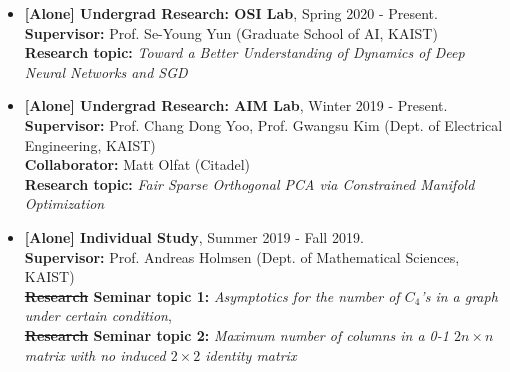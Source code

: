 \documentclass[10pt,a4]{article}
\begin{document}
\begin{small}
\begin{itemize}
 \item 
 	{\bf [Alone] Undergrad Research: OSI Lab}, Spring 2020 - Present. \\
 {\bf Supervisor:} Prof. Se-Young Yun (Graduate School of AI, KAIST) \\
 {\bf Research topic:} {\it Toward a Better Understanding of Dynamics of Deep Neural Networks and SGD } \\


 \item {\bf [Alone] Undergrad Research:
  AIM Lab}, Winter 2019 - Present. \\
 {\bf Supervisor:} Prof. Chang Dong Yoo, Prof. Gwangsu Kim (Dept. of Electrical Engineering, KAIST) \\
 {\bf Collaborator:} Matt Olfat (Citadel) \\
 {\bf Research topic:} {\it Fair Sparse Orthogonal PCA via Constrained Manifold Optimization} \\

 \item {\bf [Alone] Individual Study}, Summer 2019 - Fall 2019. \\
 {\bf Supervisor:} Prof. Andreas Holmsen (Dept. of Mathematical Sciences, KAIST) \\
 {\bf \st{Research} Seminar topic 1:} {\it Asymptotics for the number of $C_4$'s in a graph under certain condition}, \\
 {\bf \st{Research} Seminar topic 2:} {\it Maximum number of columns in a 0-1 $2n \times n$ matrix with no induced $2 \times 2$ identity matrix} \\



\end{itemize}
\end{small}
\end{document}
